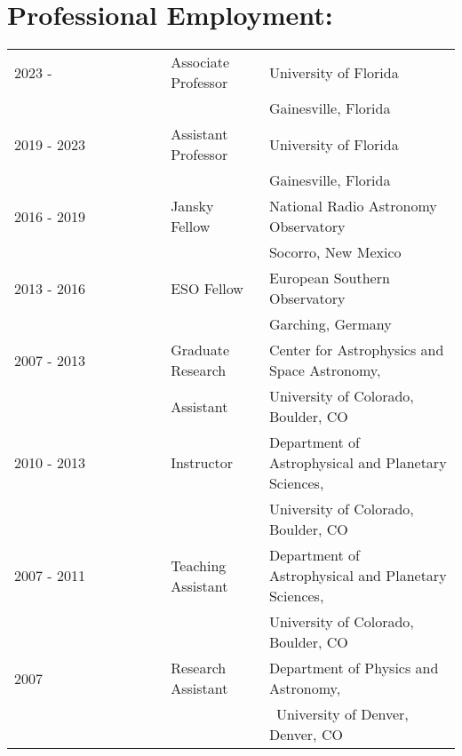\begin{minipage}{\textwidth}
\setlength{\extrarowheight}{2pt}
\section*{Professional Employment:}
\begin{listliketab}
    \begin{tabular}{lll}
        \hline
        \hline
    2023 -      &Associate Professor & University of Florida \\
                                     && Gainesville, Florida \\
    2019 - 2023 &Assistant Professor & University of Florida \\
                                     && Gainesville, Florida \\
    2016 - 2019 & Jansky Fellow  & National Radio Astronomy Observatory\\
                 &         & Socorro, New Mexico \\
    2013 - 2016 & ESO Fellow  & European Southern Observatory\\
                 &         & Garching, Germany \\
                 \hline
    2007 - 2013 & Graduate Research & Center for Astrophysics and Space Astronomy, \\
              &   Assistant         & University of Colorado, Boulder, CO \\
    2010 - 2013 & Instructor  & Department of Astrophysical and Planetary Sciences, \\
                           && University of Colorado, Boulder, CO \\
    2007 - 2011    & Teaching Assistant & Department of Astrophysical and Planetary Sciences, \\
                                    && University of Colorado, Boulder, CO \\
    2007 & Research Assistant & Department of Physics and Astronomy, \\
                                          && University of Denver, Denver, CO \\
    \hline
    \hline
    \end{tabular}
\end{listliketab}

\end{minipage}
